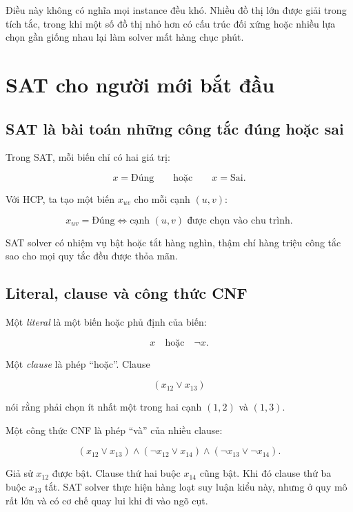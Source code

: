 \documentclass[11pt,a4paper,oneside]{scrreprt}
\begin{document}
Điều này không có nghĩa mọi instance đều khó. Nhiều đồ thị lớn được giải trong tích tắc, trong khi một số đồ thị nhỏ hơn có cấu trúc đối xứng hoặc nhiều lựa chọn gần giống nhau lại làm solver mất hàng chục phút.

\chapter{SAT cho người mới bắt đầu}

\section{SAT là bài toán những công tắc đúng hoặc sai}

Trong SAT, mỗi biến chỉ có hai giá trị:

\[
  x = \text{Đúng} \qquad\text{hoặc}\qquad x = \text{Sai}.
\]

Với HCP, ta tạo một biến $x_{uv}$ cho mỗi cạnh $(u,v)$:

\[
  x_{uv}=\text{Đúng} \Longleftrightarrow \text{cạnh $(u,v)$ được chọn vào chu trình}.
\]

SAT solver có nhiệm vụ bật hoặc tắt hàng nghìn, thậm chí hàng triệu công tắc sao cho mọi quy tắc đều được thỏa mãn.

\section{Literal, clause và công thức CNF}

Một \emph{literal} là một biến hoặc phủ định của biến:

\[
  x \quad\text{hoặc}\quad \neg x.
\]

Một \emph{clause} là phép ``hoặc''. Clause

\[
  (x_{12} \lor x_{13})
\]

nói rằng phải chọn ít nhất một trong hai cạnh $(1,2)$ và $(1,3)$.

Một công thức CNF là phép ``và'' của nhiều clause:

\[
  (x_{12} \lor x_{13})
  \land (\neg x_{12} \lor x_{14})
  \land (\neg x_{13} \lor \neg x_{14}).
\]

\begin{examplebox}
Giả sử $x_{12}$ được bật. Clause thứ hai buộc $x_{14}$ cũng bật. Khi đó clause thứ ba buộc $x_{13}$ tắt. SAT solver thực hiện hàng loạt suy luận kiểu này, nhưng ở quy mô rất lớn và có cơ chế quay lui khi đi vào ngõ cụt.
\end{examplebox}
\end{document}
